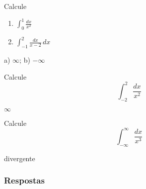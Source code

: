 \begin{exer}
  Calcule
  \begin{enumerate}
  \item $\displaystyle\int_{0}^1\frac{dx}{x^2}$
  \item $\displaystyle\int_{-1}^{2}\frac{dx}{x-2}\,dx$

  \end{enumerate}
\end{exer}
\begin{resp}
  a) $\infty$; b) $-\infty$
\end{resp}

\begin{exer}
  Calcule
  \begin{equation}
    \int_{-2}^2\frac{dx}{x^2}
  \end{equation}
\end{exer}
\begin{resp}
  $\infty$
\end{resp}

\begin{exer}
  Calcule
  \begin{equation}
    \int_{-\infty}^{\infty} \frac{dx}{x^3}
  \end{equation}
\end{exer}
\begin{resp}
  divergente
\end{resp}

\ifisbook
\subsubsection{Respostas}
\shipoutAnswer
\fi